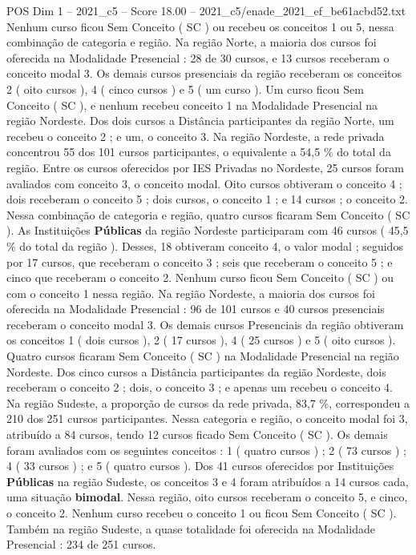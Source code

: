 \begin{textsample}{POS Dim 1 – 2021\_c5 – Score 18.00 – 2021\_c5/enade\_2021\_ef\_be61acbd52.txt}
Nenhum curso ficou Sem Conceito ( SC ) ou recebeu os conceitos 1 ou 5, nessa combinação de categoria e região.
Na região Norte, a maioria dos cursos foi oferecida na Modalidade Presencial : 28 de 30 cursos, e 13 cursos receberam o conceito modal 3.
Os demais cursos presenciais da região receberam os conceitos 2 ( oito cursos ), 4 ( cinco cursos ) e 5 ( um curso ).
Um curso ficou Sem Conceito ( SC ), e nenhum recebeu conceito 1 na Modalidade Presencial na região Nordeste.
Dos dois cursos a Distância participantes da região Norte, um recebeu o conceito 2 ; e um, o conceito 3.
Na região Nordeste, a rede privada concentrou 55 dos 101 cursos participantes, o equivalente a 54,5 \% do total da região.
Entre os cursos oferecidos por IES Privadas no Nordeste, 25 cursos foram avaliados com conceito 3, o conceito modal.
Oito cursos obtiveram o conceito 4 ; dois receberam o conceito 5 ; dois cursos, o conceito 1 ; e 14 cursos ; o conceito 2.
Nessa combinação de categoria e região, quatro cursos ficaram Sem Conceito ( SC ).
As Instituições \textbf{Públicas} da região Nordeste participaram com 46 cursos ( 45,5 \% do total da região ).
Desses, 18 obtiveram conceito 4, o valor modal ; seguidos por 17 cursos, que receberam o conceito 3 ; seis que receberam o conceito 5 ; e cinco que receberam o conceito 2.
Nenhum curso ficou Sem Conceito ( SC ) ou com o conceito 1 nessa região.
Na região Nordeste, a maioria dos cursos foi oferecida na Modalidade Presencial : 96 de 101 cursos e 40 cursos presenciais receberam o conceito modal 3.
Os demais cursos Presenciais da região obtiveram os conceitos 1 ( dois cursos ), 2 ( 17 cursos ), 4 ( 25 cursos ) e 5 ( oito cursos ).
Quatro cursos ficaram Sem Conceito ( SC ) na Modalidade Presencial na região Nordeste.
Dos cinco cursos a Distância participantes da região Nordeste, dois receberam o conceito 2 ; dois, o conceito 3 ; e apenas um recebeu o conceito 4.
Na região Sudeste, a proporção de cursos da rede privada, 83,7 \%, correspondeu a 210 dos 251 cursos participantes.
Nessa categoria e região, o conceito modal foi 3, atribuído a 84 cursos, tendo 12 cursos ficado Sem Conceito ( SC ).
Os demais foram avaliados com os seguintes conceitos : 1 ( quatro cursos ) ; 2 ( 73 cursos ) ; 4 ( 33 cursos ) ; e 5 ( quatro cursos ).
Dos 41 cursos oferecidos por Instituições \textbf{Públicas} na região Sudeste, os conceitos 3 e 4 foram atribuídos a 14 cursos cada, uma situação \textbf{bimodal}.
Nessa região, oito cursos receberam o conceito 5, e cinco, o conceito 2.
Nenhum curso recebeu o conceito 1 ou ficou Sem Conceito ( SC ).
Também na região Sudeste, a quase totalidade foi oferecida na Modalidade Presencial : 234 de 251 cursos.

\end{textsample}
